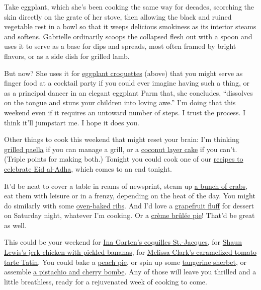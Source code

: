 Take eggplant, which she's been cooking the same way for decades,
scorching the skin directly on the grate of her stove, then allowing the
black and ruined vegetable rest in a bowl so that it weeps delicious
smokiness as its interior steams and softens. Gabrielle ordinarily
scoops the collapsed flesh out with a spoon and uses it to serve as a
base for dips and spreads, most often framed by bright flavors, or as a
side dish for grilled lamb.

But now? She uses it for
\href{https://cooking.nytimes.com/recipes/1021285-smoky-eggplant-croquettes}{eggplant
croquettes} (above) that you might serve as finger food at a cocktail
party if you could ever imagine having such a thing, or as a principal
dancer in an elegant eggplant Parm that, she concludes, ``dissolves on
the tongue and stuns your children into loving awe.'' I'm doing that
this weekend even if it requires an untoward number of steps. I trust
the process. I think it'll jumpstart me. I hope it does you.

Other things to cook this weekend that might reset your brain: I'm
thinking
\href{https://cooking.nytimes.com/recipes/1016085-grilled-paella}{grilled
paella} if you can manage a grill, or a
\href{https://cooking.nytimes.com/recipes/1017257-coconut-layer-cake}{coconut
layer cake} if you can't. (Triple points for making both.) Tonight you
could cook one of our
\href{https://cooking.nytimes.com/68861692-nyt-cooking/1688528-what-to-cook-for-eid-al-adha}{recipes
to celebrate Eid al-Adha}, which comes to an end tonight.

It'd be neat to cover a table in reams of newsprint, steam up
\href{https://cooking.nytimes.com/recipes/1013173-steamed-blue-crabs}{a
bunch of crabs}, eat them with leisure or in a frenzy, depending on the
heat of the day. You might do similarly with some
\href{https://cooking.nytimes.com/recipes/1014252-balsamic-glazed-oven-baked-ribs}{oven-baked
ribs}. And I'd love a
\href{https://cooking.nytimes.com/recipes/1013319-grapefruit-fluff}{grapefruit
fluff} for dessert on Saturday night, whatever I'm cooking. Or a
\href{https://cooking.nytimes.com/recipes/1020556-creme-brulee-pie}{crème
brûlée pie}! That'd be great as well.

This could be your weekend for
\href{https://cooking.nytimes.com/recipes/1017099-ina-gartens-make-ahead-coquilles-st-jacques}{Ina
Garten's coquilles St.-Jacques}, for
\href{https://cooking.nytimes.com/recipes/1020376-jerk-chicken-with-pickled-bananas}{Shaun
Lewis's jerk chicken with pickled bananas}, for
\href{https://cooking.nytimes.com/recipes/1017616-caramelized-tomato-tarte-tatin}{Melissa
Clark's caramelized tomato tarte Tatin}. You could bake a
\href{https://cooking.nytimes.com/recipes/1017525-perfect-peach-pie}{peach
pie}, or spin up some
\href{https://cooking.nytimes.com/recipes/1012424-tangerine-sherbet}{tangerine
sherbet}, or assemble
\href{https://cooking.nytimes.com/recipes/1020443-pistachio-and-cherry-bombe}{a
pistachio and cherry bombe}. Any of those will leave you thrilled and a
little breathless, ready for a rejuvenated week of cooking to come.

